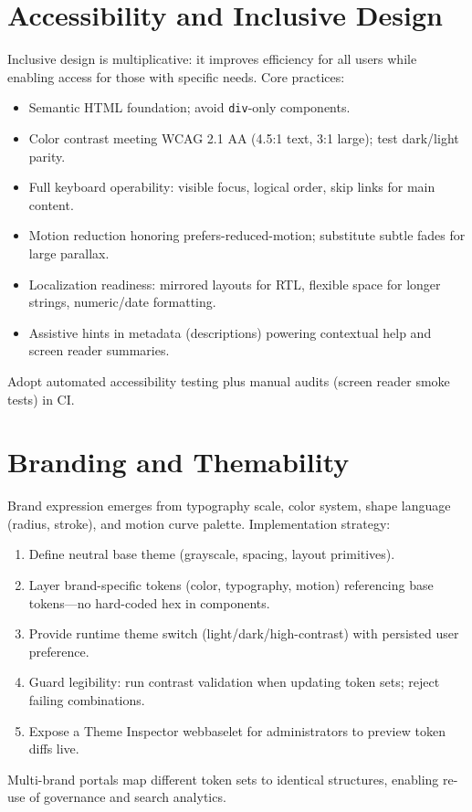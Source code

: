 \section{Accessibility and Inclusive Design}
Inclusive design is multiplicative: it improves efficiency for all users while enabling access for those with specific needs. Core practices:
\begin{itemize}
	\item Semantic HTML foundation; avoid \texttt{div}-only components.
	\item Color contrast meeting WCAG 2.1 AA (4.5:1 text, 3:1 large); test dark/light parity.
	\item Full keyboard operability: visible focus, logical order, skip links for main content.
	\item Motion reduction honoring prefers-reduced-motion; substitute subtle fades for large parallax.
	\item Localization readiness: mirrored layouts for RTL, flexible space for longer strings, numeric/date formatting.
	\item Assistive hints in metadata (descriptions) powering contextual help and screen reader summaries.
\end{itemize}
Adopt automated accessibility testing plus manual audits (screen reader smoke tests) in CI.

\section{Branding and Themability}
Brand expression emerges from typography scale, color system, shape language (radius, stroke), and motion curve palette. Implementation strategy:
\begin{enumerate}
	\item Define neutral base theme (grayscale, spacing, layout primitives).
	\item Layer brand-specific tokens (color, typography, motion) referencing base tokens—no hard-coded hex in components.
	\item Provide runtime theme switch (light/dark/high-contrast) with persisted user preference.
	\item Guard legibility: run contrast validation when updating token sets; reject failing combinations.
	\item Expose a Theme Inspector webbaselet for administrators to preview token diffs live.
\end{enumerate}
Multi-brand portals map different token sets to identical \wbdl{} structures, enabling re-use of governance and search analytics.

